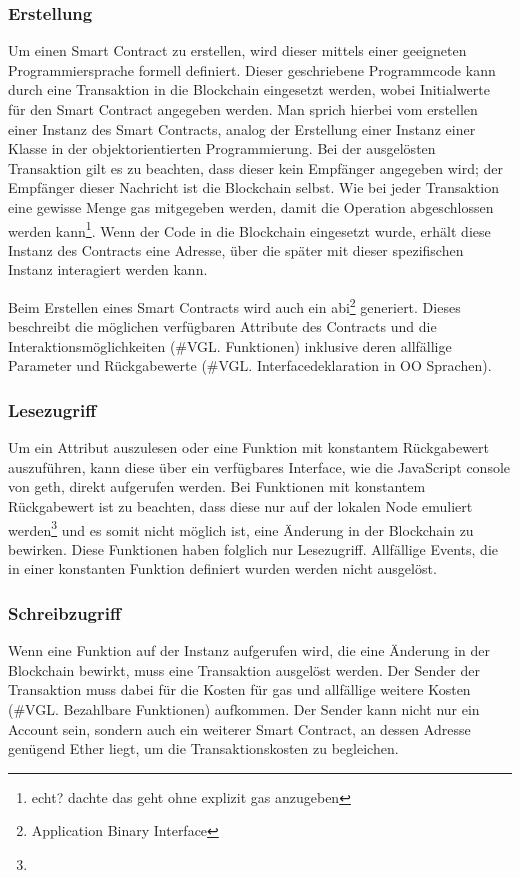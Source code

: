 \subsubsection{Erstellung}
Um einen Smart Contract zu erstellen, wird dieser mittels einer geeigneten Programmiersprache formell definiert. Dieser geschriebene Programmcode kann durch eine Transaktion in die Blockchain eingesetzt werden, wobei Initialwerte für den Smart Contract angegeben werden. Man sprich hierbei vom erstellen einer Instanz des Smart Contracts, analog der Erstellung einer Instanz einer Klasse in der objektorientierten Programmierung. Bei der ausgelösten Transaktion gilt es zu beachten, dass dieser kein Empfänger angegeben wird; der Empfänger dieser Nachricht ist die Blockchain selbst. Wie bei jeder Transaktion eine gewisse Menge gas mitgegeben werden, damit die Operation abgeschlossen werden kann\footnote{echt? dachte das geht ohne explizit gas anzugeben}. Wenn der Code in die Blockchain eingesetzt wurde, erhält diese Instanz des Contracts eine Adresse, über die später mit dieser spezifischen Instanz interagiert werden kann.

Beim Erstellen eines Smart Contracts wird auch ein abi\footnote{Application Binary Interface} generiert. Dieses beschreibt die möglichen verfügbaren Attribute des Contracts und die Interaktionsmöglichkeiten (\#VGL. Funktionen) inklusive deren allfällige Parameter und Rückgabewerte (\#VGL. Interfacedeklaration in OO Sprachen).

\subsubsection{Lesezugriff}
Um ein Attribut auszulesen oder eine Funktion mit konstantem Rückgabewert auszuführen, kann diese über ein verfügbares Interface, wie die JavaScript console von geth, direkt aufgerufen werden. Bei Funktionen mit konstantem Rückgabewert ist zu beachten, dass diese nur auf der lokalen Node emuliert werden\footnote{} und es somit nicht möglich ist, eine Änderung in der Blockchain zu bewirken. Diese Funktionen haben folglich nur Lesezugriff. Allfällige Events, die in einer konstanten Funktion definiert wurden werden nicht ausgelöst.

\subsubsection{Schreibzugriff}
Wenn eine Funktion auf der Instanz aufgerufen wird, die eine Änderung in der Blockchain bewirkt, muss eine Transaktion ausgelöst werden. Der Sender der Transaktion muss dabei für die Kosten für gas und allfällige weitere Kosten (\#VGL. Bezahlbare Funktionen) aufkommen. Der Sender kann nicht nur ein Account sein, sondern auch ein weiterer Smart Contract, an dessen Adresse genügend Ether liegt, um die Transaktionskosten zu begleichen.

